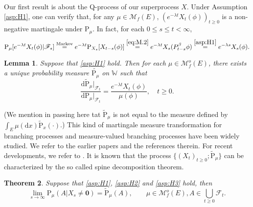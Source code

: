 \documentclass[12pt,a4paper]{amsart}
\numberwithin{equation}{section}
\theoremstyle{plain}
\newtheorem{thm}{Theorem}[section]
\newtheorem{lem}[thm]{Lemma}
\theoremstyle{definition}
\theoremstyle{remark}
\begin{document}
	Our first result is about the Q-process of our superprocess $X$.
	Under Assumption \eqref{asp:H1}, one can verify that, for any $\mu \in \mathcal M_f(E)$, $(e^{-\lambda t}  X_t(\phi))_{t\geq 0}$ is a non-negative martingale under $\mathrm P_\mu$.
	In fact, for each $0\leq s\leq t< \infty$,
\begin{equation} \label{eq:M.25}
	\mathrm P_\mu[e^{-\lambda t}X_t(\phi)|\mathscr F_s]
	\overset{\text{Markov}} = e^{-\lambda t} \mathrm P_{X_s}[X_{t-s}(\phi)]
	\overset{\eqref{eq:M.2}}= e^{-\lambda t}X_s(P_{t-s}^\beta \phi)
	\overset{\eqref{asp:H1}}=e^{-\lambda s}X_s(\phi).
\end{equation}
	\begin{lem} \label{thm:T}
	Suppose that \eqref{asp:H1} hold. Then for each $\mu \in \mathcal M_f^o(E)$, 
	there exists a unique probability measure $\widetilde {\mathrm P_\mu}$
	on $\mathbb W$ such that
\begin{equation} \label{eq:M.3}
	\frac{{\mathrm d}\widetilde{\mathrm P}_\mu|_{\mathscr F_t}}
	{{\mathrm d}\mathrm P_\mu|_{\mathscr F_t}}
	=\frac{e^{-\lambda t}X_t(\phi)}{\mu(\phi) },
	\quad t\geq 0.
\end{equation}
\end{lem}

	(We mention in passing here tat $\widetilde {\mathrm P}_\mu$ is not equal to the measure defined by $\int_E\mu(\mathrm dx)\widetilde {\mathrm P}_x(\cdot)$.)
	This kind of martingale measure transformation for branching processes and measure-valued branching processes have been widely studied.
	We refer to the earlier papers \cite{EnglanderKyprianou2004Local,Evans1993Two,RoellyRouault1989Processus,Penisson2010Conditional} and the references therein.
	For recent developments, we refer to \cite{ChampagnatRoelly2008Limit,RenSongSun2020Spine,RenSongZhang2018Williams}.
	It is known that the process $\{(X_t)_{t\geq 0}; \widetilde{\mathrm P}_{\mu}\}$ can be characterized by the so called spine decomposition theorem.
	\begin{thm} \label{thm:Q}
	Suppose that \eqref{asp:H1}, \eqref{asp:H2} and \eqref{asp:H3} hold, then
\[
	\lim_{s \rightarrow \infty} \mathrm P_\mu(A |X_s\neq \mathbf 0)=
	\widetilde{\mathrm P}_\mu(A),
	\qquad \mu \in \mathcal M_f^o(E), A\in \bigcup_{t\geq 0}\mathscr F_t.
\]
\end{thm}
\end{document}
